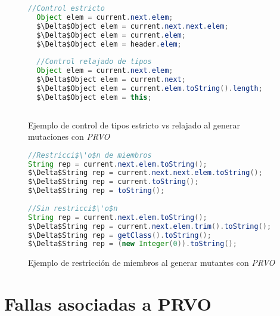 \begin{figure}
	\begin{lstlisting}[mathescape=true, language=Java, extendedchars=true,basicstyle={}]
  //Control estricto
  Object elem = current.next.elem;
  $\Delta$Object elem = current.next.next.elem;
  $\Delta$Object elem = current.elem;
  $\Delta$Object elem = header.elem;
  
  //Control relajado de tipos
  Object elem = current.next.elem;
  $\Delta$Object elem = current.next;
  $\Delta$Object elem = current.elem.toString().length;
  $\Delta$Object elem = this;
	
	\end{lstlisting}
	\caption[Ejemplo de control de tipos usado por \emph{PRVO}]{Ejemplo de control de tipos estricto vs relajado al generar mutaciones con \emph{PRVO}}
	\label{figures.examples.strictVsRelaxedTypeCheck}
\end{figure}

\begin{figure}
	\begin{lstlisting}[mathescape=true, language=Java, extendedchars=true,basicstyle={}]
//Restricci$\'o$n de miembros
String rep = current.next.elem.toString();
$\Delta$String rep = current.next.next.elem.toString();
$\Delta$String rep = current.toString();
$\Delta$String rep = toString();
	
//Sin restricci$\'o$n
String rep = current.next.elem.toString();
$\Delta$String rep = current.next.elem.trim().toString();
$\Delta$String rep = getClass().toString();
$\Delta$String rep = (new Integer(0)).toString();
	\end{lstlisting}
	\caption[Ejemplo de restricci\'on de miembros usado por \emph{PRVO}]{Ejemplo de restricci\'on de miembros al generar mutantes con \emph{PRVO}}
	\label{figures.examples.memberRestriction}
\end{figure}

\section{Fallas asociadas a PRVO}
\label{sec:prvo.prvoTargetedFaults}

